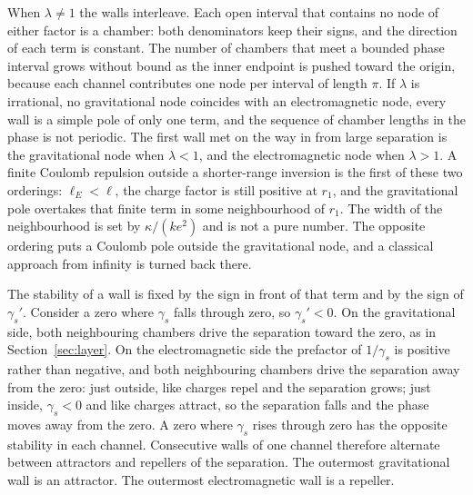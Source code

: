 \documentclass[a4paper]{article}
\begin{document}
When \(\lambda\neq 1\) the walls interleave. Each open interval that contains no node of either factor is a chamber: both denominators keep their signs, and the direction of each term is constant. The number of chambers that meet a bounded phase interval grows without bound as the inner endpoint is pushed toward the origin, because each channel contributes one node per interval of length \(\pi\). If \(\lambda\) is irrational, no gravitational node coincides with an electromagnetic node, every wall is a simple pole of only one term, and the sequence of chamber lengths in the phase is not periodic. The first wall met on the way in from large separation is the gravitational node when \(\lambda<1\), and the electromagnetic node when \(\lambda>1\). A finite Coulomb repulsion outside a shorter-range inversion is the first of these two orderings: \(\ell_E<\ell\), the charge factor is still positive at \(r_1\), and the gravitational pole overtakes that finite term in some neighbourhood of \(r_1\). The width of the neighbourhood is set by \(\kappa/(k e^{2})\) and is not a pure number. The opposite ordering puts a Coulomb pole outside the gravitational node, and a classical approach from infinity is turned back there.

The stability of a wall is fixed by the sign in front of that term and by the sign of \(\gamma_s'\). Consider a zero where \(\gamma_s\) falls through zero, so \(\gamma_s'<0\). On the gravitational side, both neighbouring chambers drive the separation toward the zero, as in Section~\ref{sec:layer}. On the electromagnetic side the prefactor of \(1/\gamma_s\) is positive rather than negative, and both neighbouring chambers drive the separation away from the zero: just outside, like charges repel and the separation grows; just inside, \(\gamma_s<0\) and like charges attract, so the separation falls and the phase moves away from the zero. A zero where \(\gamma_s\) rises through zero has the opposite stability in each channel. Consecutive walls of one channel therefore alternate between attractors and repellers of the separation. The outermost gravitational wall is an attractor. The outermost electromagnetic wall is a repeller.
\end{document}
